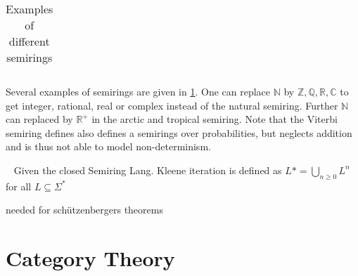 \begin{example}
\begin{table}[htp]
\begin{tabular}{|p{5cm}|p{4cm}|p{4cm}|}
                \hline
                \end{tabular}
                \caption{Examples of different semirings}
                \label{table:1}
                \end{table}
                Several examples of semirings are given in \ref{table:1}.
                One can replace $\mathbb{N}$ by $\mathbb{Z}, \mathbb{Q}, \mathbb{R}, \mathbb{C}$ to get integer, rational, real or complex instead of the natural semiring. Further $\mathbb{N}$ can replaced by $\mathbb{R^+}$ in the arctic and tropical semiring. Note that the Viterbi semiring defines also defines a semirings over probabilities, but neglects addition and is thus not able to model non-determinism.
            \end{example}
            
            \begin{example}~\autocite{HWA}
             Given the closed Semiring Lang.
             Kleene iteration is defined as $L* =  \bigcup_{n \geq 0} L^n$ for all $L \subseteq \Sigma^*$ 
            \end{example}

            
            needed for schützenbergers theorems
            \begin{definition}[Semimodule]
             
            \end{definition}
            
            \begin{theorem}
             
            \end{theorem}

            
  

            
            
    \section{Category Theory}
        
        \begin{definition}
        \end{definition}
        

